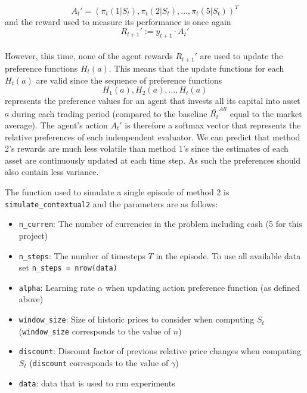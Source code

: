 \documentclass[a4paper,12pt]{article}
\newcommand{\code}[1]{\texttt{#1}}
\begin{document}
$$A_t' = (\pi_t(1|S_t),\pi_t(2|S_t),...,\pi_t(5|S_t))^T$$ 
and the reward used to measure its performance is once again
$$R_{t+1}' :=  y_{t+1} \cdot A_t'$$ \\
However, this time, none of the agent rewards $R_{t+1}'$ are used to update the preference functions $H_t(a)$. This means that the update functions for each $H_t(a)$ are valid since the sequence of preference functions 
$$H_1(a),H_2(a),...,H_t(a)$$
represents the preference values for an agent that invests all its capital into asset $a$ during each trading period (compared to the baseline $\bar{R_t}^{All}$ equal to the market average). The agent's action $A_t'$ is therefore a softmax vector that represents the relative preferences of each indenpendent evaluator. We can predict that method 2's rewards are much less volatile than method 1's since the estimates of each asset are continuously updated at each time step. As such the preferences should also contain less variance.

The function used to simulate a single episode of method 2 is \code{simulate\_contextual2} and the parameters are as follows:
\begin{itemize}
  \item \code{n\_curren}: The number of currencies in the problem including cash (5 for this project)
  \item \code{n\_steps}: The number of timesteps $T$ in the episode. To use all available data set \code{n\_steps = nrow(data)}
  \item \code{alpha}: Learning rate $\alpha$ when updating action preference function (as defined above)
  \item \code{window\_size}: Size of historic prices to consider when computing $S_t$ (\code{window\_size} corresponds to the value of $n$)
  \item \code{discount}: Discount factor of previous relative price changes when computing $S_t$ (\code{discount} corresponds to the value of $\gamma$)
  \item \code{data}: data that is used to run experiments
\end{itemize}
\end{document}
